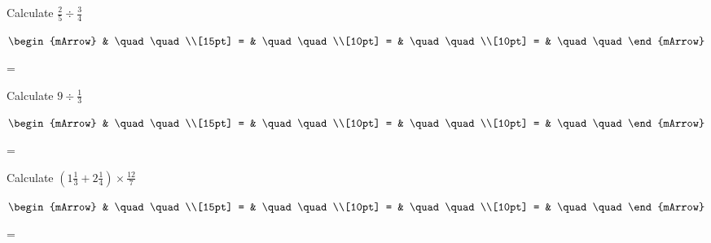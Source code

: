 \clearpage\noindent%
\begin{mtask}
   \task \begin{exercise} Calculate $  \frac{2}{5}  \div  \frac{3}{4} $
           \begin{envSolution}[height=8cm]
             $\begin{mArrow} 
			       & \quad \quad              \\[15pt]
                 = & \quad \quad              \\[10pt]
		   		 = & \quad \quad              \\[10pt]
				 = & \quad \quad 
              \end{mArrow}$
            \begin{shortsolution}  
			     =$ \quad \quad \quad \quad$
			\end{shortsolution}				 
           \end{envSolution}
         \end{exercise}
   \task \begin{exercise} Calculate $ 9 \div \frac{1}{3}  $
           \begin{envSolution}[height=8cm]
             $\begin{mArrow} 
			       & \quad \quad              \\[15pt]
                 = & \quad \quad              \\[10pt]
		   		 = & \quad \quad              \\[10pt]
				 = & \quad \quad 
              \end{mArrow}$
            \begin{shortsolution}  
			     =$ \quad \quad \quad \quad$
			\end{shortsolution}				 
           \end{envSolution}
         \end{exercise}

   \task \begin{exercise} Calculate $ \left(1\frac{1}{3}+ 2\frac{1}{4}\right) \times \frac{12}{7}  $
           \begin{envSolution}[height=8cm]
             $\begin{mArrow} 
			       & \quad \quad              \\[15pt]
                 = & \quad \quad              \\[10pt]
		   		 = & \quad \quad              \\[10pt]
				 = & \quad \quad 
              \end{mArrow}$
            \begin{shortsolution}  
			     =$ \quad \quad \quad \quad$
			\end{shortsolution}				 
           \end{envSolution}
         \end{exercise}


\end{mtask}
